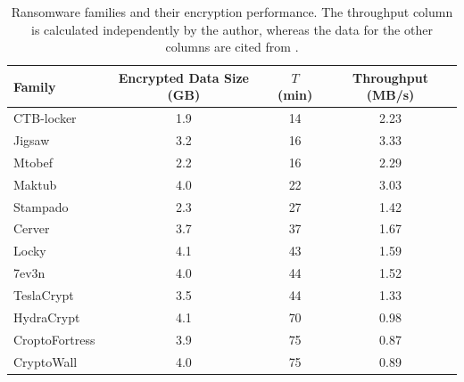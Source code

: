 \begin{table}[htbp]
  \centering
  \caption{Ransomware families and their encryption performance.
    The throughput column is calculated independently by the author,
    whereas the data for the other columns are cited from \cite{huang2017flashguard}.}

  \label{tab:ransomware_performance}
  \begin{tabular}{lccc}
    \hline
    Family         & Encrypted Data Size (GB) & $T$ (min) & Throughput (MB/s) \\
    \hline
    CTB-locker     & 1.9                      & 14        & 2.23              \\
    Jigsaw         & 3.2                      & 16        & 3.33              \\
    Mtobef         & 2.2                      & 16        & 2.29              \\
    Maktub         & 4.0                      & 22        & 3.03              \\
    Stampado       & 2.3                      & 27        & 1.42              \\
    Cerver         & 3.7                      & 37        & 1.67              \\
    Locky          & 4.1                      & 43        & 1.59              \\
    7ev3n          & 4.0                      & 44        & 1.52              \\
    TeslaCrypt     & 3.5                      & 44        & 1.33              \\
    HydraCrypt     & 4.1                      & 70        & 0.98              \\
    CroptoFortress & 3.9                      & 75        & 0.87              \\
    CryptoWall     & 4.0                      & 75        & 0.89              \\
    \hline
  \end{tabular}
\end{table}


